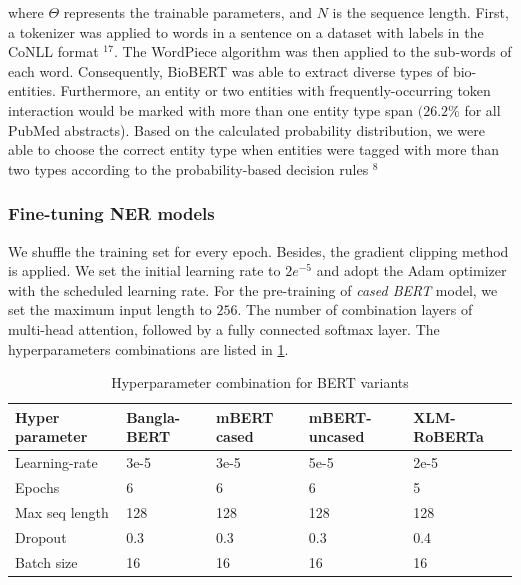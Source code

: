 \hspace*{3.5mm} where $\Theta$ represents the trainable parameters, and $N$ is the sequence length. First, a tokenizer was applied to words in a sentence on a dataset with labels in the CoNLL format $^{17}$. The WordPiece algorithm was then applied to the sub-words of each word. Consequently, BioBERT was able to extract diverse types of bio-entities. Furthermore, an entity or two entities with frequently-occurring token interaction would be marked with more than one entity type span $(26.2 \%$ for all PubMed abstracts). Based on the calculated probability distribution, we were able to choose the correct entity type when entities were tagged with more than two types according to the probability-based decision rules $^{8}$

\subsubsection{Fine-tuning NER models}
We shuffle the training set for every epoch. Besides, the gradient clipping method is applied. We set the initial learning rate to $2 e^{-5}$ and adopt the Adam optimizer with the scheduled learning rate. For the pre-training of \textit{cased BERT} model, we set the maximum input length to $256$. The number of combination layers of multi-head attention, followed by a fully connected softmax layer. The hyperparameters combinations are listed in  \cref{table:bert_params}. 

\begin{table}
    \centering
    \caption{Hyperparameter combination for BERT variants}
    \label{table:bert_params}
    \begin{tabular}{l|l|l|l|l}
        \hline
         \textbf{Hyper parameter}  & \textbf{Bangla-BERT}  &
         \textbf{mBERT cased} &
         \textbf{mBERT-uncased} & \textbf{XLM-RoBERTa}\\
        \hline
        Learning-rate  & 3e-5  & 3e-5 & 5e-5 & 2e-5 \\
        Epochs & 6 & 6 & 6 & 5 \\
        Max seq length & 128 & 128 & 128 & 128 \\
        Dropout & 0.3 & 0.3 & 0.3 & 0.4 \\
        Batch size & 16 & 16 & 16 & 16 \\
        \hline
    \end{tabular}
\end{table}

